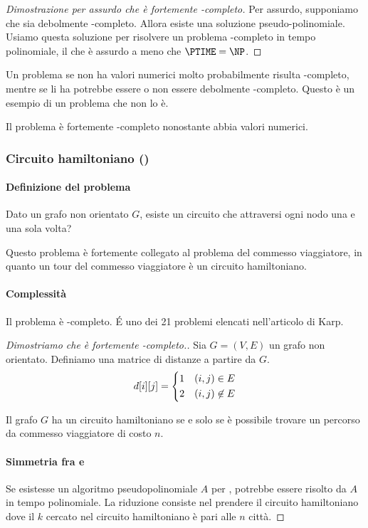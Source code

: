 \begin{proof}[Dimostrazione per assurdo che {\tsp} è fortemente \NP-completo]
Per assurdo, supponiamo che {\tsp} sia debolmente \NP-completo.
Allora esiste una soluzione pseudo-polinomiale.
Usiamo questa soluzione per risolvere un problema \NP-completo in tempo polinomiale, il che è assurdo a meno che \(\PTIME = \NP\).
\end{proof}

Un problema se non ha valori numerici molto probabilmente risulta {\NP}-completo, mentre se li ha potrebbe essere o non essere debolmente {\NP}-completo.
Questo è un esempio di un problema che non lo è.

\begin{note}
Il problema {\tsp} è fortemente \NP-completo nonostante abbia valori numerici.
\end{note}

\subsubsection{Circuito hamiltoniano (\hamiltonianCircuit)}

\paragraph{Definizione del problema}
Dato un grafo non orientato \(G\), esiste un circuito che attraversi ogni nodo una e una sola volta?

Questo problema è fortemente collegato al problema del commesso viaggiatore, in quanto un tour del commesso viaggiatore è un circuito hamiltoniano.

\paragraph{Complessità}
Il problema {\hamiltonianCircuit} è \NP-completo.
\'{E} uno dei 21 problemi elencati nell'articolo di Karp.

\begin{proof}[Dimostriamo che {\tsp} è fortemente \NP-completo.]
Sia \(G = (V,E)\) un grafo non orientato.
Definiamo una matrice di distanze a partire da \(G\).
\[
	d[i][j] =
	\begin{dcases}
		1 & (i,j) \in E\\
		2 & (i,j) \not\in E\\
	\end{dcases}
\]

Il grafo \(G\) ha un circuito hamiltoniano se e solo se è possibile trovare un percorso da commesso viaggiatore di costo \(n\).

\paragraph{Simmetria fra {\tsp} e {\hamiltonianCircuit}}
Se esistesse un algoritmo pseudopolinomiale \(A\) per {\tsp}, {\hamiltonianCircuit} potrebbe essere risolto da \(A\) in tempo polinomiale.
La riduzione consiste nel prendere il circuito hamiltoniano dove il \(k\) cercato nel circuito hamiltoniano è pari alle \(n\) città.
\end{proof}

